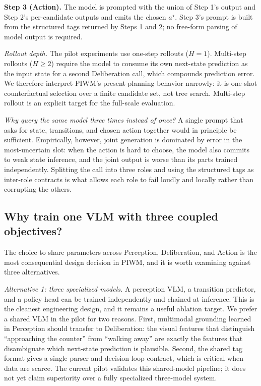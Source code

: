 \documentclass{article}
\begin{document}
\textbf{Step 3 (Action).}
The model is prompted with the union of Step 1's output and Step 2's per-candidate outputs and emits the chosen $a^\star$. Step 3's prompt is built from the structured tags returned by Steps 1 and 2; no free-form parsing of model output is required.

\textit{Rollout depth.}
The pilot experiments use one-step rollouts ($H=1$). Multi-step rollouts ($H \ge 2$) require the model to consume its own next-state prediction as the input state for a second Deliberation call, which compounds prediction error. We therefore interpret PIWM's present planning behavior narrowly: it is one-shot counterfactual selection over a finite candidate set, not tree search. Multi-step rollout is an explicit target for the full-scale evaluation.

\textit{Why query the same model three times instead of once?}
A single prompt that asks for state, transitions, and chosen action together would in principle be sufficient. Empirically, however, joint generation is dominated by error in the most-uncertain slot: when the action is hard to choose, the model also commits to weak state inference, and the joint output is worse than its parts trained independently. Splitting the call into three roles and using the structured tags as inter-role contracts is what allows each role to fail loudly and locally rather than corrupting the others.

\subsection{Why train one VLM with three coupled objectives?}
\label{sec:method:coupling}

The choice to share parameters across Perception, Deliberation, and Action is the most consequential design decision in PIWM, and it is worth examining against three alternatives.

\textit{Alternative 1: three specialized models.}
A perception VLM, a transition predictor, and a policy head can be trained independently and chained at inference. This is the cleanest engineering design, and it remains a useful ablation target. We prefer a shared VLM in the pilot for two reasons. First, multimodal grounding learned in Perception should transfer to Deliberation: the visual features that distinguish ``approaching the counter'' from ``walking away'' are exactly the features that disambiguate which next-state prediction is plausible. Second, the shared tag format gives a single parser and decision-loop contract, which is critical when data are scarce. The current pilot validates this shared-model pipeline; it does not yet claim superiority over a fully specialized three-model system.
\end{document}
